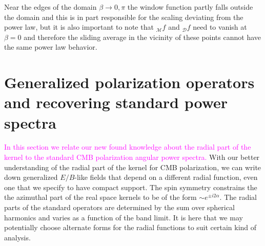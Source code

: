 \documentclass[a4paper,11pt]{article}
\newcommand{\mm}{\mathcal{M}}
\newcommand{\md}{\mathcal{D}}
\newcommand{\addtext}{\textcolor{magenta}  }
\begin{document}
Near the edges of the domain $\beta \rightarrow 0,\pi$ the window function partly falls outside the domain and this is in part responsible for the scaling deviating from the power law, but it is also important to note that ${}_{\mm}f$ and ${}_{\md}f$ need to vanish at $\beta=0$ and therefore the sliding average in the vicinity of these points cannot have the same power law behavior.
%
\section{Generalized polarization operators and recovering standard power spectra}\label{sec:generalized_operators}  
\addtext{In this section we relate our new found knowledge about the radial part of the kernel to the standard CMB polarization angular power spectra.} With our better understanding of the radial part of the kernel for CMB polarization, we can write down generalized $E/B$-like fields that depend on a different radial function, even one that we specify to have compact support.
The spin symmetry constrains the the azimuthal part of the real space kernels to be of the form $\sim e^{\pm i2 \alpha}$.  The radial parts of the standard operators are determined by the sum over spherical harmonics and varies as a function of the band limit. It is here that we may potentially choose alternate forms for the radial functions to suit certain kind of analysis.
\end{document}
